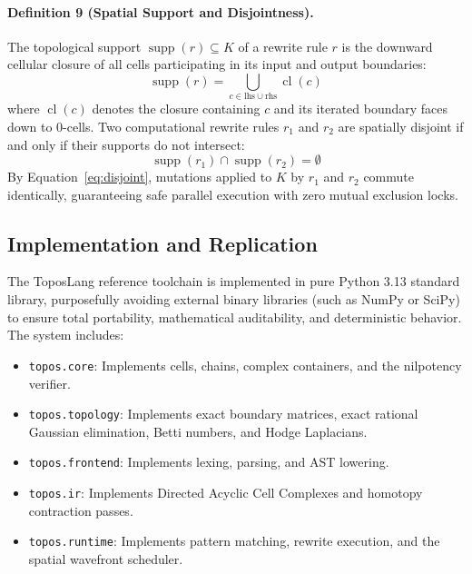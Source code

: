 \documentclass[10pt,a4paper]{article}
\begin{document}
\paragraph{Definition 9 (Spatial Support and Disjointness).}
The topological support $\operatorname{supp}(r) \subseteq K$ of a rewrite rule $r$ is the downward cellular closure of all cells participating in its input and output boundaries:
\begin{equation}
\operatorname{supp}(r) = \bigcup_{c \in \text{lhs} \cup \text{rhs}} \operatorname{cl}(c)
\label{eq:support}
\end{equation}
where $\operatorname{cl}(c)$ denotes the closure containing $c$ and its iterated boundary faces down to 0-cells. Two computational rewrite rules $r_1$ and $r_2$ are spatially disjoint if and only if their supports do not intersect:
\begin{equation}
\operatorname{supp}(r_1) \cap \operatorname{supp}(r_2) = \emptyset
\label{eq:disjoint}
\end{equation}
By Equation~\ref{eq:disjoint}, mutations applied to $K$ by $r_1$ and $r_2$ commute identically, guaranteeing safe parallel execution with zero mutual exclusion locks.

\subsection{Implementation and Replication}
The ToposLang reference toolchain is implemented in pure Python 3.13 standard library, purposefully avoiding external binary libraries (such as NumPy or SciPy) to ensure total portability, mathematical auditability, and deterministic behavior. The system includes:
\begin{itemize}
    \item \texttt{topos.core}: Implements cells, chains, complex containers, and the nilpotency verifier.
    \item \texttt{topos.topology}: Implements exact boundary matrices, exact rational Gaussian elimination, Betti numbers, and Hodge Laplacians.
    \item \texttt{topos.frontend}: Implements lexing, parsing, and AST lowering.
    \item \texttt{topos.ir}: Implements Directed Acyclic Cell Complexes and homotopy contraction passes.
    \item \texttt{topos.runtime}: Implements pattern matching, rewrite execution, and the spatial wavefront scheduler.
\end{itemize}
\end{document}
